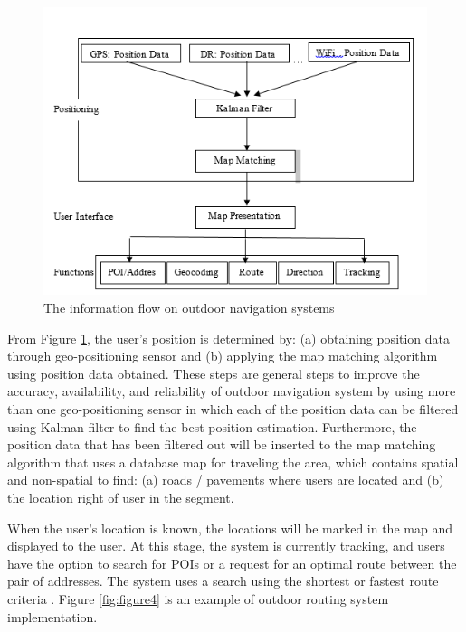 \begin{figure}[h!]
	\centering
	\includegraphics[scale=0.7]{figure3.png}
	\caption{The information flow on outdoor navigation systems \cite{karimi2011universal}}
	\label{fig:figure3}
\end{figure}

From Figure \ref{fig:figure3}, the user's position is determined by: (a) obtaining position data through geo-positioning sensor and (b) applying the map matching algorithm using position data obtained. These steps are general steps to improve the accuracy, availability, and reliability of outdoor navigation system by using more than one geo-positioning sensor in which each of the position data can be filtered using Kalman filter to find the best position estimation. Furthermore, the position data that has been filtered out will be inserted to the map matching algorithm that uses a database map for traveling the area, which contains spatial and non-spatial to find: (a) roads / pavements where users are located and (b) the location right of user in the segment.

When the user's location is known, the locations will be marked in the map and displayed to the user. At this stage, the system is currently tracking, and users have the option to search for POIs or a request for an optimal route between the pair of addresses. The system uses a search using the shortest or fastest route criteria \cite{karimi2011universal}. Figure \ref{fig:figure4} is an example of outdoor routing system implementation.

